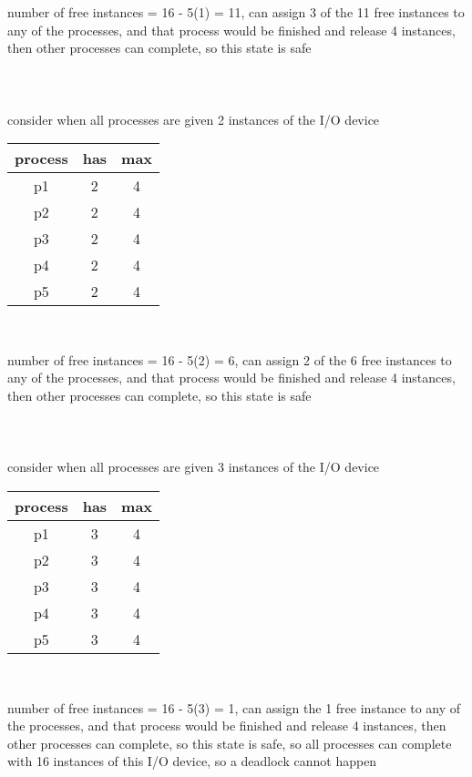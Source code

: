 \documentclass[12pt, border = 4pt, multi]{article} %
\begin{document}
number of free instances = 16 - 5(1) = 11, can assign 3 of the 11 free instances to any of the processes, and that process would be finished and release 4 instances, then other processes can complete, so this state is safe\\
\\
\\
\\
consider when all processes are given 2 instances of the I/O device
\begin{center}
\begin{tabular}{|c|c|c|}\hline
process & has & max\\\hline
p1 & 2 & 4\\\hline 
p2 & 2 & 4\\\hline  
p3 & 2 & 4\\\hline
p4 & 2 & 4\\\hline  
p5 & 2 & 4\\\hline
\end{tabular}\\
\end{center}
number of free instances = 16 - 5(2) = 6, can assign 2 of the 6 free instances to any of the processes, and that process would be finished and release 4 instances, then other processes can complete, so this state is safe\\
\\
\\
\\
consider when all processes are given 3 instances of the I/O device
\begin{center}
\begin{tabular}{|c|c|c|}\hline
process & has & max\\\hline
p1 & 3 & 4\\\hline 
p2 & 3 & 4\\\hline  
p3 & 3 & 4\\\hline
p4 & 3 & 4\\\hline  
p5 & 3 & 4\\\hline
\end{tabular}\\
\end{center}
number of free instances = 16 - 5(3) = 1, can assign the 1 free instance to any of the processes, and that process would be finished and release 4 instances, then other processes can complete, so this state is safe, so all processes can complete with 16 instances of this I/O device, so a deadlock cannot happen\\
\\
\end{document}
